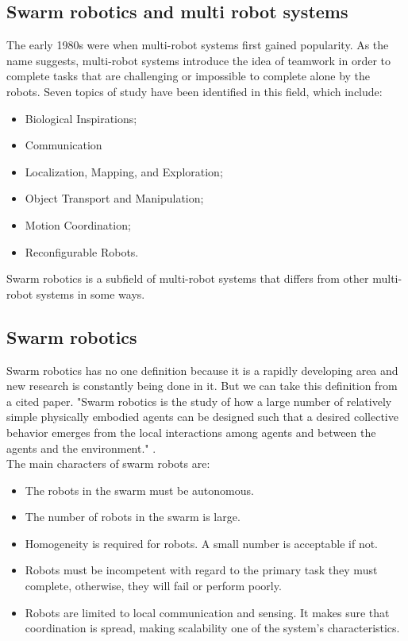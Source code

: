 \documentclass[12pt]{extarticle}
\begin{document}
\subsection{Swarm robotics and multi robot systems}
The early 1980s were when multi-robot systems first gained popularity. As the name suggests, multi-robot systems introduce the idea of teamwork in order to complete tasks that are challenging or impossible to complete alone by the robots. Seven topics of study have been identified in this field, which include: 
\begin{itemize} 
\item Biological Inspirations; 
\item Communication 
\item Localization, Mapping, and Exploration;
\item Object Transport and Manipulation; 
\item Motion Coordination; 
\item Reconfigurable Robots. 
\end{itemize} Swarm robotics is a subfield of multi-robot systems that differs from other multi-robot systems in some ways. \cite{arai2002advances}  


 

\subsection{Swarm robotics}
Swarm robotics has no one definition because it is a rapidly developing area and new research is constantly being done in it. But we can take this definition from a cited paper. "Swarm robotics is the study of how a large number of relatively simple physically embodied agents can be designed such that a desired collective behavior emerges from the local interactions among agents and between the agents and the environment." \cite{csahin2005swarm}.\\
The main characters of swarm robots are:
 \begin{itemize} 
\item The robots in the swarm must be autonomous.
\item The number of robots in the swarm is large.
\item Homogeneity is required for robots. A small number is acceptable if not.
\item Robots must be incompetent with regard to the primary task they must complete, otherwise, they will fail or perform poorly.
\item Robots are limited to local communication and sensing. It makes sure that coordination is spread, making scalability one of the system's characteristics. \cite{navarro2013introduction} \end{itemize}
\end{document}
